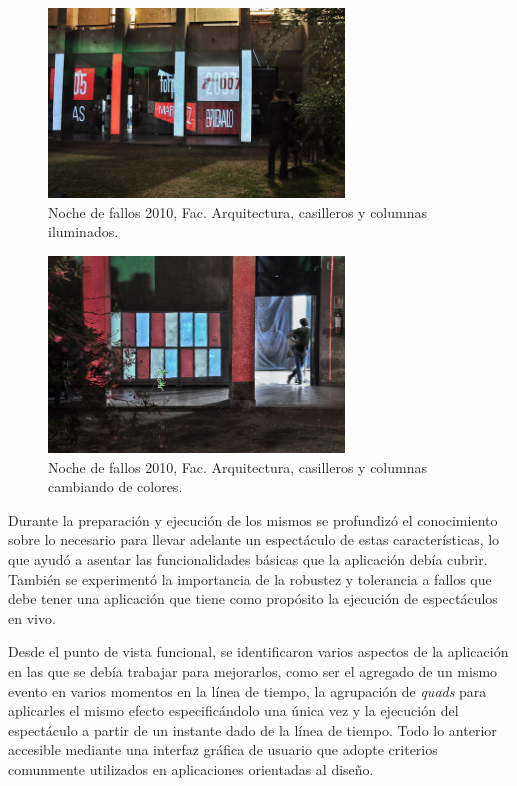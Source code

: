 \begin{figure}[H]
  \centering
    \includegraphics[width=0.7\textwidth]{./Cap7_conclusiones/Arqui2.jpg}
  \caption[http://www.farq.edu.uy/patio/conferencias-exposiciones-y-seminarios/noche-de-fallos-7.html]{Noche de fallos 2010, Fac. Arquitectura, casilleros y columnas iluminados.}
  \label{fig:Arquitectura2}
\end{figure}

\begin{figure}[H]
  \centering
    \includegraphics[width=0.7\textwidth]{./Cap7_conclusiones/Arqui3.jpg}
  \caption[http://www.farq.edu.uy/patio/conferencias-exposiciones-y-seminarios/noche-de-fallos-7.html]{Noche de fallos 2010, Fac. Arquitectura, casilleros y columnas cambiando de colores.}
  \label{fig:Arquitectura3}
\end{figure}

Durante la preparación y ejecución de los mismos se profundizó el conocimiento sobre lo necesario para llevar adelante un espectáculo de estas características, lo que ayudó a asentar las funcionalidades básicas que la aplicación debía cubrir. También se experimentó la importancia de la robustez y tolerancia a fallos que debe tener una aplicación que tiene como propósito la ejecución de espectáculos en vivo.

Desde el punto de vista funcional, se identificaron varios aspectos de la aplicación en las que se debía trabajar para mejorarlos, como ser el agregado de un mismo evento en varios momentos en la línea de tiempo, la agrupación de \emph{quads} para aplicarles el mismo efecto especificándolo una única vez y la ejecución del espectáculo a partir de un instante dado de la línea de tiempo. Todo lo anterior accesible mediante una interfaz gráfica de usuario que adopte criterios comunmente utilizados en aplicaciones orientadas al diseño.

